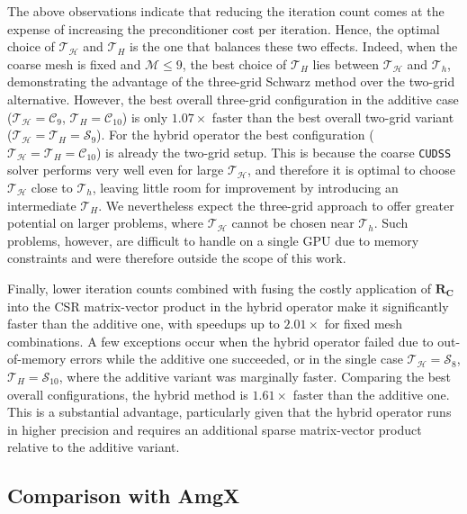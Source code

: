 \documentclass[11pt]{article}
\theoremstyle{definition}
\theoremstyle{theorem}
\begin{document}
The above observations indicate that reducing the iteration count comes at the
expense of increasing the preconditioner cost per iteration. Hence,
the optimal choice of $\mathcal{T}_\mathcal{H}$ and $\mathcal{T}_H$ is the one
that balances these two effects. Indeed, when the coarse mesh is fixed and
$\mathcal{M}\leq 9$, the best choice of $\mathcal{T}_H$ lies between $\mathcal{T}_\mathcal{H}$
and $\mathcal{T}_h$, demonstrating the advantage of the three\nobreakdash-grid Schwarz method
over the two-grid alternative. However, the best overall three\nobreakdash-grid configuration in the additive case
($\mathcal{T}_\mathcal{H}=\mathcal{C}_9$, $\mathcal{T}_H=\mathcal{C}_{10}$)
is only $1.07\times$ faster than the best overall two-grid variant
($\mathcal{T}_\mathcal{H}=\mathcal{T}_H=\mathcal{S}_{9}$). For the hybrid operator
the best configuration ($\mathcal{T}_{\mathcal{H}}=\mathcal{T}_H=\mathcal{C}_{10}$)
is already the two-grid setup. This is because the coarse \verb|CUDSS| solver performs very well even
for large $\mathcal{T}_\mathcal{H}$, and therefore it is optimal to choose
$\mathcal{T}_\mathcal{H}$ close to $\mathcal{T}_h$, leaving little room for
improvement by introducing an intermediate $\mathcal{T}_H$. We nevertheless
expect the three\nobreakdash-grid approach to offer greater potential on larger problems,
where $\mathcal{T}_\mathcal{H}$ cannot be chosen near $\mathcal{T}_h$.
Such problems, however, are difficult to handle on a single GPU due to memory
constraints and were therefore outside the scope of this work.

Finally, lower iteration counts combined with fusing
the costly application of $\bm{R_C}$ into the CSR matrix-vector product
in the hybrid operator make it significantly faster than the additive one,
with speedups up to $2.01\times$ for fixed mesh combinations.
A few exceptions occur when the hybrid operator failed due to
out-of-memory errors while the additive one succeeded, or in the single case
$\mathcal{T}_\mathcal{H}=\mathcal{S}_8$, $\mathcal{T}_H=\mathcal{S}_{10}$,
where the additive variant was marginally faster. Comparing the
best overall configurations, the hybrid method is $1.61\times$ faster
than the additive one. This is a substantial advantage, particularly given
that the hybrid operator runs in higher precision and requires an
additional sparse matrix-vector product relative to the additive variant.

\subsection{Comparison with AmgX}
\label{sec:experiments-amgx-comparison}
\end{document}
